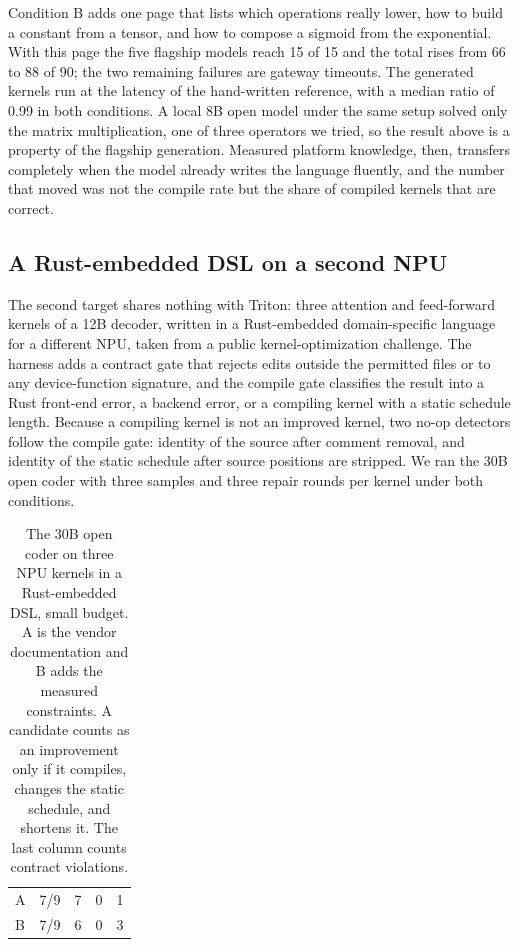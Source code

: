 Condition B adds one page that lists which operations really lower, how to build a constant from a
tensor, and how to compose a sigmoid from the exponential. With this page the five flagship models
reach 15 of 15 and the total rises from 66 to 88 of 90; the two remaining failures are gateway
timeouts. The generated kernels run at the latency of the hand-written reference, with a median ratio
of 0.99 in both conditions. A local 8B open model under the same setup solved only the matrix
multiplication, one of three operators we tried, so the result above is a property of the flagship
generation. Measured platform knowledge, then, transfers completely when the model already writes
the language fluently, and the number that moved was not the compile rate but the share of compiled
kernels that are correct.

\subsection{A Rust-embedded DSL on a second NPU}\label{sec:app-npu-dsl}

The second target shares nothing with Triton: three attention and feed-forward kernels of a 12B
decoder, written in a Rust-embedded domain-specific language for a different NPU, taken from a public
kernel-optimization challenge. The harness adds a contract gate that rejects edits outside the
permitted files or to any device-function signature, and the compile gate classifies the result into
a Rust front-end error, a backend error, or a compiling kernel with a static schedule length.
Because a compiling kernel is not an improved kernel, two no-op detectors follow the compile gate:
identity of the source after comment removal, and identity of the static schedule after source
positions are stripped. We ran the 30B open coder with three samples and three repair rounds per
kernel under both conditions.

\begin{table}[t]
\centering
\small
\setlength{\tabcolsep}{5pt}
\caption{The 30B open coder on three NPU kernels in a Rust-embedded DSL, small budget. A is the
vendor documentation and B adds the measured constraints. A candidate counts as an improvement only
if it compiles, changes the static schedule, and shortens it. The last column counts contract
violations.}
\label{tab:app-npu-dsl}
\begin{tabular}{@{}lrrrr@{}}
\toprule
\headrow{Cond.} & \headrow{Compiled} & \headrow{No-op} & \headrow{Improved} & \headrow{Violations} \\
\midrule
A & 7/9 & 7 & 0 & 1 \\
B & 7/9 & 6 & 0 & 3 \\
\bottomrule
\end{tabular}
\end{table}

